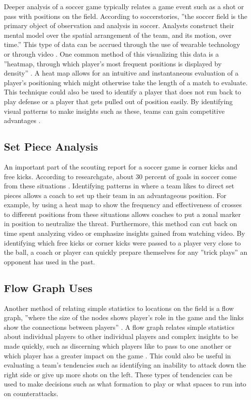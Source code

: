 \documentclass[sigconf]{acmart}
\begin{document}
{Deeper analysis of a soccer game typically relates a game event such as a shot or pass with positions on the field. According to soccerstories, ''the soccer field is the primary object of observation and analysis in soccer. Analysts construct their mental model over the spatial arrangement of the team, and its motion, over time.''\cite{SoccerStories} This type of data can be accrued through the use of wearable technology or through video \cite{SoccerStories}. One common method of this visualizing this data is a ''heatmap, through which player's most frequent positions is displayed by density'' \cite{SoccerStories}. A heat map allows for an intuitive and instantaneous evaluation of a player’s positioning which might otherwise take the length of a match to evaluate. This technique could also be used to identify a player that does not run back to play defense or a player that gets pulled out of position easily. By identifying visual patterns to make insights such as these, teams can gain competitive advantages \cite{SoccerStories}.

\subsection{Set Piece Analysis}

An important part of the scouting report for a soccer game is corner kicks and free kicks. According to researchgate, about 30 percent of goals in soccer come from these situations \cite{ResearchGate}. Identifying patterns in where a team likes to direct set pieces allows a coach to set up their team in an advantageous position. For example, by using a heat map to show the frequency and effectiveness of crosses to different positions from these situations allows coaches to put a zonal marker in position to neutralize the threat. Furthermore, this method can cut back on time spent analyzing video or emphasize insights gained from watching video. By identifying which free kicks or corner kicks were passed to a player very close to the ball, a coach or player can quickly prepare themselves for any ''trick plays'' an opponent has used in the past.

\subsection{Flow Graph Uses}

Another method of relating simple statistics to locations on the field is a flow graph, ''where the size of the nodes shows player's role in the game and the links show the connections between players'' \cite{SoccerStories}. A flow graph relates simple statistics about individual players to other individual players and complex insights to be made quickly, such as discerning which players like to pass to one another or which player has a greater impact on the game \cite{SoccerStories}. This could also be useful in evaluating a team’s tendencies such as identifying an inability to attack down the right side or give up more shots on the left. These types of tendencies can be used to make decisions such as what formation to play or what spaces to run into on counterattacks.

}
\end{document}
